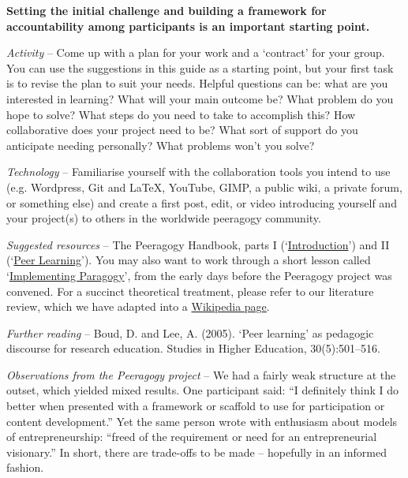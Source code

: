 \textbf{Setting the initial challenge and building a framework for
accountability among participants is an important starting point.}

\emph{Activity} -- Come up with a plan for your work and a `contract'
for your group. You can use the suggestions in this guide as a starting
point, but your first task is to revise the plan to suit your needs.
Helpful questions can be: what are you interested in learning? What will
your main outcome be? What problem do you hope to solve? What steps do
you need to take to accomplish this? How collaborative does your project
need to be? What sort of support do you anticipate needing personally?
What problems won't you solve?

\emph{Technology} -- Familiarise yourself with the collaboration tools
you intend to use (e.g. Wordpress, Git and LaTeX, YouTube, GIMP, a
public wiki, a private forum, or something else) and create a first
post, edit, or video introducing yourself and your project(s) to others
in the worldwide peeragogy community.

\emph{Suggested resources} -- The Peeragogy Handbook, parts I
(`\href{http://peeragogy.org/}{Introduction}') and II
(`\href{http://peeragogy.org/peer-learning/}{Peer Learning}'). You may
also want to work through a short lesson called
`\href{https://en.wikiversity.org/wiki/User:Arided/ImplementingParagogy}{Implementing
Paragogy}', from the early days before the Peeragogy project was
convened. For a succinct theoretical treatment, please refer to our
literature review, which we have adapted into a
\href{http://en.wikipedia.org/wiki/Peer\_learning}{Wikipedia page}.

\emph{Further reading} -- Boud, D. and Lee, A. (2005). `Peer learning'
as pedagogic discourse for research education. Studies in Higher
Education, 30(5):501--516.

\emph{Observations from the Peeragogy project} -- We had a fairly weak
structure at the outset, which yielded mixed results. One participant
said: ``I definitely think I do better when presented with a framework
or scaffold to use for participation or content development.'' Yet the
same person wrote with enthusiasm about models of entrepreneurship:
``freed of the requirement or need for an entrepreneurial visionary.''
In short, there are trade-offs to be made -- hopefully in an informed
fashion.

